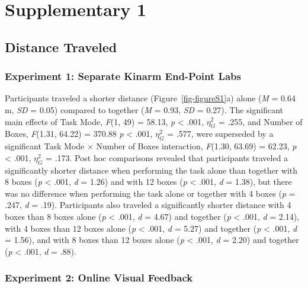 \documentclass[
  11pt,
  letterpaper,
]{article}
\renewcommand{\emph}[1]{\textit{#1}}  %
\begin{document}
\clearpage
\setcounter{page}{1}
\resetlinenumber

\renewcommand{\thefigure}{S\arabic{figure}}
\setcounter{figure}{0}

\section{Supplementary 1}\label{supplementary-1}

\subsection{Distance Traveled}\label{distance-traveled}

\subsubsection{Experiment 1: Separate Kinarm End-Point
Labs}\label{experiment-1-separate-kinarm-end-point-labs-2}

Participants traveled a shorter distance (Figure~\ref{fig-figureS1}a)
alone (\emph{M} = 0.64 m, \emph{SD} = 0.05) compared to together
(\emph{M} = 0.93, \emph{SD} = 0.27). The significant main effects of
Task Mode, \emph{F}(1, 49) = 58.13, \emph{p} \textless{} .001,
\(\eta_{G}^{2}\) = .255, and Number of Boxes, \emph{F}(1.31, 64.22) =
370.88 \emph{p} \textless{} .001, \(\eta_{G}^{2}\) = .577, were
superseded by a significant Task Mode × Number of Boxes interaction,
\emph{F}(1.30, 63.69) = 62.23, \emph{p} \textless{} .001,
\(\eta_{G}^{2}\) = .173. Post hoc comparisons revealed that participants
traveled a significantly shorter distance when performing the task alone
than together with 8 boxes (\emph{p} \textless{} .001, \emph{d} = 1.26)
and with 12 boxes (\emph{p} \textless{} .001, \emph{d} = 1.38), but
there was no difference when performing the task alone or together with
4 boxes (\emph{p} = .247, \emph{d} = .19). Participants also traveled a
significantly shorter distance with 4 boxes than 8 boxes alone (\emph{p}
\textless{} .001, \emph{d} = 4.67) and together (\emph{p} \textless{}
.001, \emph{d} = 2.14), with 4 boxes than 12 boxes alone (\emph{p}
\textless{} .001, \emph{d} = 5.27) and together (\emph{p} \textless{}
.001, \emph{d} = 1.56), and with 8 boxes than 12 boxes alone (\emph{p}
\textless{} .001, \emph{d} = 2.20) and together (\emph{p} \textless{}
.001, \emph{d} = .88).

\subsubsection{Experiment 2: Online Visual
Feedback}\label{experiment-2-online-visual-feedback-2}
\end{document}
